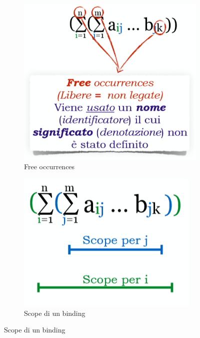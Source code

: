 \documentclass[a4paper,oneside,titlepage]{book}
\begin{document}
\begin{figure}[htp]
\begin{subfigure}{0.49\textwidth}
		\includegraphics[width=\textwidth, height=\textheight, keepaspectratio]{focc.png} 
		\caption{Free occurrences}
	\end{subfigure}
	\begin{subfigure}{0.49\textwidth}
		\includegraphics[width=\textwidth, height=\textheight, keepaspectratio]{scope.png}
		\caption{Scope di un binding}
	\end{subfigure}
\end{figure}
\end{document}
